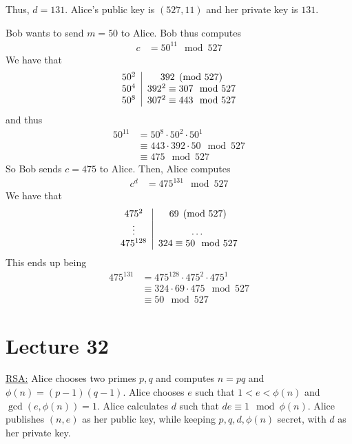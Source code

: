 \documentclass{article}
\begin{document}
Thus, $d=131$. Alice's public key is $(527, 11)$ and her private key is $131$. 

Bob wants to send $m=50$ to Alice. Bob thus computes \begin{align*}
    c&=50^{11}\mod 527
\end{align*}We have that \begin{align*}
    \begin{tabular}{c|c}
        $50^2$ & $392\pmod{527}$\\
        $50^4$ & $392^2\equiv 307\mod{527}$\\
        $50^8$ & $307^2\equiv 443\mod{527}$\\
    \end{tabular}
\end{align*}and thus \begin{align*}
    50^{11}&=50^{8}\cdot 50^2\cdot 50^1\\
    &\equiv 443\cdot 392\cdot 50\mod{527}\\
    &\equiv 475\mod{527}
\end{align*}
So Bob sends $c=475$ to Alice. Then, Alice computes \begin{align*}
    c^d&=475^{131}\mod{527}
\end{align*}We have that \begin{align*}
    \begin{tabular}{c|c}
        $475^2$ & $69\pmod{527}$\\
        \vdots & $\dots$\\
        $475^{128}$ & $324\equiv 50\mod{527}$
    \end{tabular}
\end{align*}This ends up being \begin{align*}
    475^{131}&=475^{128}\cdot 475^2\cdot 475^1\\
    &\equiv 324\cdot 69\cdot 475\mod{527}\\
    &\equiv 50\mod{527}
\end{align*}

\section{Lecture 32}

\underline{RSA:} Alice chooses two primes $p,q$ and computes $n=pq$ and $\phi(n)=(p-1)(q-1)$. Alice chooses $e$ such that $1<e<\phi(n)$ and $\gcd(e,\phi(n))=1$. Alice calculates $d$ such that $de\equiv 1\mod \phi(n)$. Alice publishes $(n,e)$ as her public key, while keeping $p,q,d,\phi(n)$ secret, with $d$ as her private key.
\end{document}
